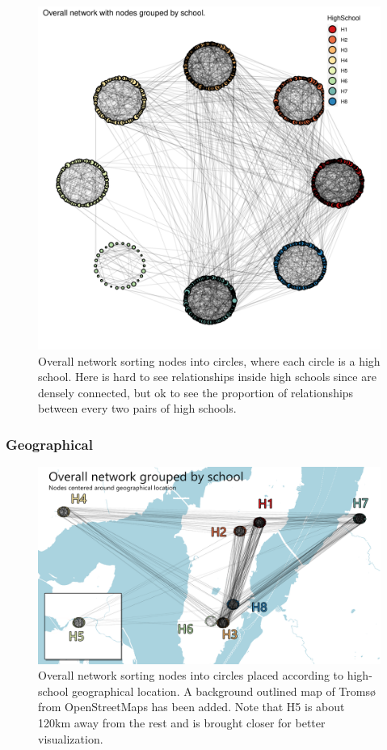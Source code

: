     \begin{figure}[h!]
        \centering
            \includegraphics[width=0.7\linewidth]{figures/Networks/Layouts/Graph_OverallNetwork_HS_societal_HighSchool___manual.png} 
        \caption{Overall network sorting nodes into circles, where each circle is a high school. Here is hard to see relationships inside high schools since are densely connected, but ok to see the proportion of relationships between every two pairs of high schools.}
        \label{figure:networksLayoutsMANUAL}
    \end{figure}        

    \newpage

\subsubsection{Geographical}

    \begin{figure}[h!]
        \centering
            \includegraphics[width=0.9\linewidth]{figures/Networks/Layouts/schoolmapsGraph.png} 
        \caption{Overall network sorting nodes into circles placed according to high-school geographical location. A background outlined map of Tromsø from OpenStreetMaps has been added. Note that H5 is about 120km away from the rest and is brought closer for better visualization.}
        \label{figure:networksLayoutsGEOGRAPHICAL}
    \end{figure}        

